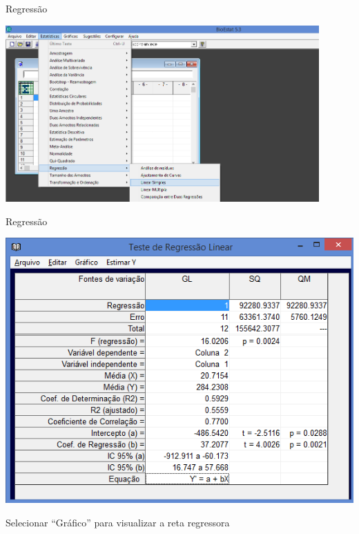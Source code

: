 \documentclass{beamer}
\begin{document}
\begin{frame}{Regressão}
  \begin{center}
    \includegraphics[width=0.9\textwidth]{selecao_regressao}
  \end{center}
\end{frame}

\begin{frame}{Regressão}
  \begin{center}
    \includegraphics[height=0.7\textheight]{resultado_regressao}
  \end{center}

Selecionar ``Gráfico'' para visualizar a reta regressora
\end{frame}
\end{document}
